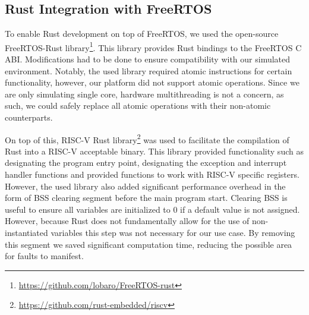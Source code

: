\subsection{Rust Integration with FreeRTOS}

To enable Rust development on top of FreeRTOS, we used the open-source FreeRTOS-Rust library\footnote{\url{https://github.com/lobaro/FreeRTOS-rust}}. This library provides Rust bindings to the FreeRTOS C ABI. Modifications had to be done to ensure compatibility with our simulated environment. Notably, the used library required atomic instructions for certain functionality, however, our platform did not support atomic operations. Since we are only simulating single core, hardware multithreading is not a concern, as such, we could safely replace all atomic operations with their non-atomic counterparts.

On top of this, RISC-V Rust library\footnote{\url{https://github.com/rust-embedded/riscv}} was used to facilitate the compilation of Rust into a RISC-V acceptable binary. This library provided functionality such as designating the program entry point, designating the exception and interrupt handler functions and provided functions to work with RISC-V specific registers. However, the used library also added significant performance overhead in the form of BSS clearing segment before the main program start. Clearing BSS is useful to ensure all variables are initialized to 0 if a default value is not assigned. However, because Rust does not fundamentally allow for the use of non-instantiated variables this step was not necessary for our use case. By removing this segment we saved significant computation time, reducing the possible area for faults to manifest.